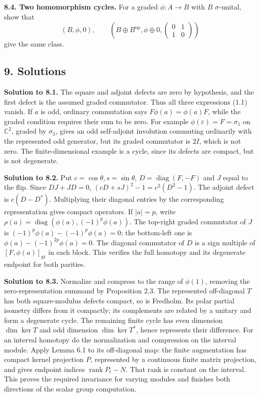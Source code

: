 \documentclass[
  11pt,
]{article}
\begin{document}
\textbf{8.4. Two homomorphism cycles.} For a graded \(\phi:A\to B\) with
\(B\) \(\sigma\)-unital, show that \[
(B,\phi,0),\qquad
\left(B\oplus B^{\mathrm{op}},\phi\oplus0,
\begin{pmatrix}0&1\\1&0\end{pmatrix}\right)
\] give the same class.

\subsection{9. Solutions}\label{solutions}

\textbf{Solution to 8.1.} The square and adjoint defects are zero by
hypothesis, and the first defect is the assumed graded commutator. Thus
all three expressions (1.1) vanish. If \(a\) is odd, ordinary
commutation says \(F\phi(a)=\phi(a)F\), while the graded condition
requires their sum to be zero. For example
\(\phi(\varepsilon)=F=\sigma_1\) on \(\mathbb C^2\), graded by
\(\sigma_3\), gives an odd self-adjoint involution commuting ordinarily
with the represented odd generator, but its graded commutator is \(2I\),
which is not zero. The finite-dimensional example is a cycle, since its
defects are compact, but is not degenerate.

\textbf{Solution to 8.2.} Put \(c=\cos\theta,s=\sin\theta\),
\(D=\operatorname{diag}(F,-F)\) and \(J\) equal to the flip. Since
\(DJ+JD=0\), \((cD+sJ)^2-1=c^2(D^2-1)\). The adjoint defect is
\(c(D-D^*)\). Multiplying their diagonal entries by the corresponding
representation gives compact operators. If \(|a|=p\), write
\(\rho(a)=\operatorname{diag}(\phi(a),(-1)^p\phi(a))\). The top-right
graded commutator of \(J\) is \((-1)^p\phi(a)-(-1)^p\phi(a)=0\); the
bottom-left one is \(\phi(a)-(-1)^{2p}\phi(a)=0\). The diagonal
commutator of \(D\) is a sign multiple of \([F,\phi(a)]_{\mathrm{gr}}\)
in each block. This verifies the full homotopy and its degenerate
endpoint for both parities.

\textbf{Solution to 8.3.} Normalize and compress to the range of
\(\phi(1)\), removing the zero-representation summand by Proposition
2.3. The represented off-diagonal \(T\) has both square-modulus defects
compact, so is Fredholm. Its polar partial isometry differs from it
compactly; its complements are related by a unitary and form a
degenerate cycle. The remaining finite cycle has even dimension
\(\dim\ker T\) and odd dimension \(\dim\ker T^*\), hence represents
their difference. For an interval homotopy do the normalization and
compression on the interval module. Apply Lemma 6.1 to its off-diagonal
map: the finite augmentation has compact kernel projection \(P\),
represented by a continuous finite matrix projection, and gives endpoint
indices \(\operatorname{rank}P_t-N\). That rank is constant on the
interval. This proves the required invariance for varying modules and
finishes both directions of the scalar group computation.
\end{document}

